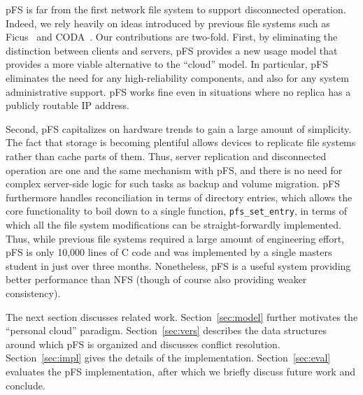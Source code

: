 pFS is far from the first network file system to support disconnected
operation.  Indeed, we rely heavily on ideas introduced by previous
file systems such as Ficus~\cite{page:ficus} and
CODA~\cite{kistler:coda}.  Our contributions are two-fold.  First, by
eliminating the distinction between clients and servers, pFS provides
a new usage model that provides a more viable alternative to the
``cloud'' model.  In particular, pFS eliminates the need for any
high-reliability components, and also for any system administrative
support.  pFS works fine even in situations where no replica has a
publicly routable IP address.

Second, pFS capitalizes on hardware trends to gain a large amount of
simplicity.  The fact that storage is becoming plentiful allows
devices to replicate file systems rather than cache parts of them.
Thus, server replication and disconnected operation are one and the
same mechanism with pFS, and there is no need for complex server-side
logic for such tasks as backup and volume migration.  pFS furthermore
handles reconciliation in terms of directory entries, which allows the
core functionality to boil down to a single function,
\texttt{pfs\_set\_entry}, in terms of which all the file system
modifications can be straight-forwardly implemented.  Thus, while
previous file systems required a large amount of engineering effort,
pFS is only 10,000 lines of C code and was implemented by a single
masters student in just over three months.  Nonetheless, pFS is a
useful system providing better performance than NFS (though of course
also providing weaker consistency).

The next section discusses related work.  Section~\ref{sec:model}
further motivates the ``personal cloud'' paradigm.
Section~\ref{sec:vers} describes the data structures around which pFS
is organized and discusses conflict resolution.
Section~\ref{sec:impl} gives the details of the implementation.
Section~\ref{sec:eval} evaluates the pFS implementation, after which
we briefly discuss future work and conclude.

